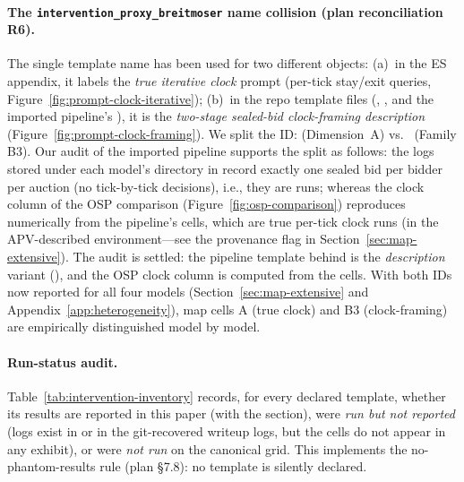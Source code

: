 \paragraph{The \texttt{intervention\_proxy\_breitmoser} name collision (plan reconciliation R6).} The single template name  has been used for two different objects: (a)~in the ES appendix, it labels the \emph{true iterative clock} prompt (per-tick stay/exit queries, Figure~\ref{fig:prompt-clock-iterative}); (b)~in the repo template files (, , and the imported pipeline's ), it is the \emph{two-stage sealed-bid clock-framing description} (Figure~\ref{fig:prompt-clock-framing}). We split the ID:  (Dimension~A) vs.\  (Family B3). Our audit of the imported pipeline supports the split as follows: the logs stored under each model's  directory in  record exactly one sealed bid per bidder per auction (no tick-by-tick decisions), i.e., they are  runs; whereas the clock column of the OSP comparison (Figure~\ref{fig:osp-comparison}) reproduces numerically from the pipeline's  cells, which are true per-tick clock runs (in the APV-described environment---see the provenance flag in Section~\ref{sec:map-extensive}). The audit is settled: the pipeline template behind  is the \emph{description} variant (), and the OSP clock column is computed from the  cells. With both IDs now reported for all four models (Section~\ref{sec:map-extensive} and Appendix~\ref{app:heterogeneity}), map cells A (true clock) and B3 (clock-framing) are empirically distinguished model by model.

\paragraph{Run-status audit.} Table~\ref{tab:intervention-inventory} records, for every declared template, whether its results are reported in this paper (with the section), were \emph{run but not reported} (logs exist in  or in the git-recovered writeup logs, but the cells do not appear in any exhibit), or were \emph{not run} on the canonical grid. This implements the no-phantom-results rule (plan \S7.8): no template is silently declared.

